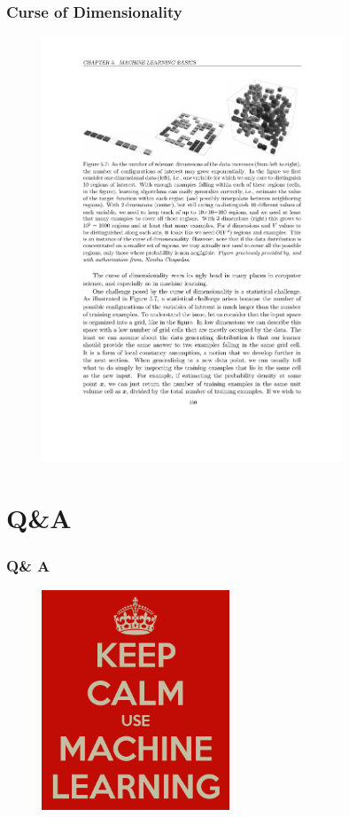 \documentclass{beamer}
\begin{document}
\begin{frame}
  \frametitle{Curse of Dimensionality}

  \begin{figure}
    \centering
    \includegraphics[width=0.8\textwidth]{curse_of_dimensionality.pdf}
  \end{figure}
\end{frame}

\section*{Q\&A}
\begin{frame}
  \frametitle{Q\& A}
  \begin{figure}
    \centering
    \includegraphics[width=0.5\textwidth]{machine_learning_logo.png}
  \end{figure}
\end{frame}
\end{document}
